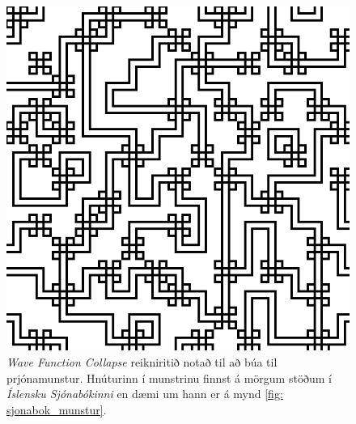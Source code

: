 \begin{figure}[p]
    \centering
    \includegraphics[width=0.5\linewidth]{myndir/snaeja/wfc.png}
    \caption{\textit{Wave Function Collapse} reikniritið notað til að búa til prjónamunstur. Hnúturinn í munstrinu finnst á mörgum stöðum í \textit{Íslensku Sjónabókinni} en dæmi um hann er á mynd \ref{fig: sjonabok_munstur}.}
    \label{fig:wfc}
\end{figure}

